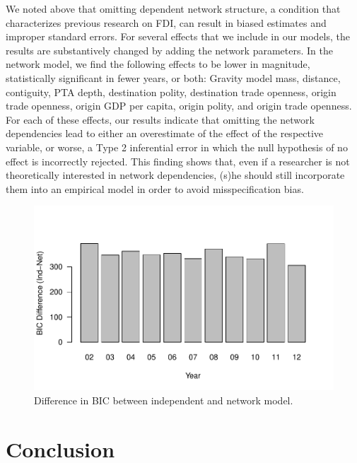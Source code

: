 \documentclass[reqno,onecolumn,letterpaper,12pt]{article}
\begin{document}
We noted above that omitting dependent network structure, a condition that characterizes previous research on FDI, can result in biased estimates and improper standard errors. For several effects that we include in our models, the results are substantively changed by adding the network parameters. In the network model, we find the following effects to be lower in magnitude, statistically significant in fewer years, or both: Gravity model mass, distance, contiguity, PTA depth, destination polity, destination trade openness, origin trade openness, origin GDP per capita, origin polity, and origin trade openness. For each of these effects, our results indicate that omitting the network dependencies lead to either an overestimate of the effect of the respective variable, or worse, a Type 2 inferential error in which the null hypothesis of no effect is incorrectly rejected. This finding shows that, even if a researcher is not theoretically interested in network dependencies, (s)he should still incorporate them into an empirical model in order to avoid misspecification bias.

\begin{figure}[!h]
\centering
\includegraphics[scale=.75]{draft_figures/BICdiff.pdf} \vspace{-.5cm}
\caption{\label{fig:bic} Difference in BIC between independent and network model.}
\end{figure}


\section{Conclusion}
\end{document}
